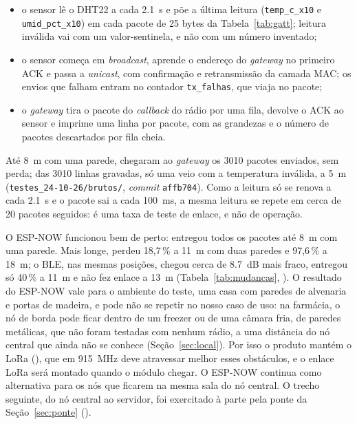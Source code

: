 \begin{itemize}
  \item o sensor lê o DHT22 a cada \SI{2,1}{\second} e põe a última
    leitura (\texttt{temp\_c\_x10} e \texttt{umid\_pct\_x10}) em cada
    pacote de 25 bytes da Tabela~\ref{tab:gatt}; leitura inválida vai com
    um valor-sentinela, e não com um número inventado;
  \item o sensor começa em \emph{broadcast}, aprende o endereço do
    \emph{gateway} no primeiro ACK e passa a \emph{unicast}, com
    confirmação e retransmissão da camada MAC; os envios que falham
    entram no contador \texttt{tx\_falhas}, que viaja no pacote;
  \item o \emph{gateway} tira o pacote do \emph{callback} do rádio por
    uma fila, devolve o ACK ao sensor e imprime uma linha por pacote,
    com as grandezas e o número de pacotes descartados por fila cheia.
\end{itemize}

Até \SI{8}{\metre} com uma parede, chegaram ao \emph{gateway} os
\num{3010} pacotes enviados, sem perda; das \num{3010} linhas gravadas,
só uma veio com a temperatura inválida, a \SI{5}{\metre}
(\texttt{testes\_24-10-26/brutos/}, \emph{commit} \texttt{affb704}).
Como a leitura só se renova a cada \SI{2,1}{\second} e o pacote sai a
cada \SI{100}{\milli\second}, a mesma leitura se repete em cerca de 20
pacotes seguidos: é uma taxa de teste de enlace, e não de operação.

O ESP-NOW funcionou bem de perto: entregou todos os pacotes até
\SI{8}{\metre} com uma parede. Mais longe, perdeu 18,7\,\% a
\SI{11}{\metre} com duas paredes e 97,6\,\% a \SI{18}{\metre}; o BLE,
nas mesmas posições, chegou cerca de \SI{8,7}{\deci\bel} mais fraco,
entregou só 40\,\% a \SI{11}{\metre} e não fez enlace a \SI{13}{\metre}
(Tabela~\ref{tab:mudancas}, ). O resultado do ESP-NOW vale para
o ambiente do teste, uma casa com paredes de alvenaria e portas de
madeira, e pode não se repetir no nosso caso de uso: na farmácia, o nó
de borda pode ficar dentro de um freezer ou de uma câmara fria, de
paredes metálicas, que não foram testadas com nenhum rádio, a uma
distância do nó central que ainda não se conhece
(Seção~\ref{sec:local}). Por isso o produto mantém o LoRa (),
que em \SI{915}{\mega\hertz} deve atravessar melhor esses obstáculos, e
o enlace LoRa será montado quando o módulo chegar. O ESP-NOW continua
como alternativa para os nós que ficarem na mesma sala do nó central. O trecho seguinte, do nó central ao
servidor, foi exercitado à parte pela ponte da Seção~\ref{sec:ponte}
().

